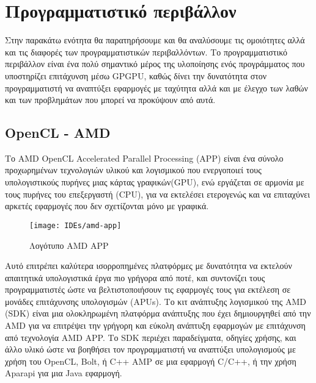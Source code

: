 \chapter{Προγραμματιστικό περιβάλλον}
Στην παρακάτω ενότητα θα παρατηρήσουμε και θα αναλύσουμε τις ομοιότητες αλλά και τις διαφορές των προγραμματιστικών περιβαλλόντων. 
Το προγραμματιστικό περιβάλλον είναι ένα πολύ σημαντικό μέρος της υλοποίησης ενός προγράμματος που υποστηρίζει επιτάχυνση μέσω GPGPU, καθώς δίνει την δυνατότητα στον προγραμματιστή να αναπτύξει εφαρμογές με ταχύτητα αλλά και με έλεγχο των λαθών και των προβλημάτων που μπορεί να προκύψουν από αυτά.
\section{OpenCL - AMD}
Το AMD OpenCL Accelerated Parallel Processing (APP) είναι ένα σύνολο προχωρημένων τεχνολογιών υλικού και λογισμικού που ενεργοποιεί τους υπολογιστικούς πυρήνες μιας κάρτας γραφικών(GPU), ενώ εργάζεται σε αρμονία με τους πυρήνες του επεξεργαστή (CPU), για να εκτελέσει ετερογενώς και να επιταχύνει αρκετές εφαρμογές που δεν σχετίζονται μόνο με γραφικά.

\begin{figure}[h]
\centering
\texttt{[image: IDEs/amd-app]}
\caption{Λογότυπο AMD APP\cite{figure-29}}
\end{figure}

Αυτό επιτρέπει καλύτερα ισορροπημένες πλατφόρμες με δυνατότητα να εκτελούν απαιτητικά υπολογιστικά έργα πιο γρήγορα από ποτέ, και συντονίζει τους προγραμματιστές ώστε να βελτιστοποιήσουν τις εφαρμογές τους για εκτέλεση σε μονάδες επιτάχυνσης υπολογισμών (APUs). Το κιτ ανάπτυξης λογισμικού της AMD (SDK) είναι μια ολοκληρωμένη πλατφόρμα ανάπτυξης που έχει δημιουργηθεί από την AMD για να επιτρέψει την γρήγορη και εύκολη ανάπτυξη εφαρμογών με επιτάχυνση από τεχνολογία AMD APP. Το SDK περιέχει παραδείγματα, οδηγίες χρήσης, και άλλο υλικό ώστε να βοηθήσει τον προγραμματιστή να αναπτύξει υπολογισμούς με χρήση του OpenCL, Bolt, ή C++ AMP σε μια εφαρμογή C/C++, ή την χρήση Aparapi για μια Java εφαρμογή.

